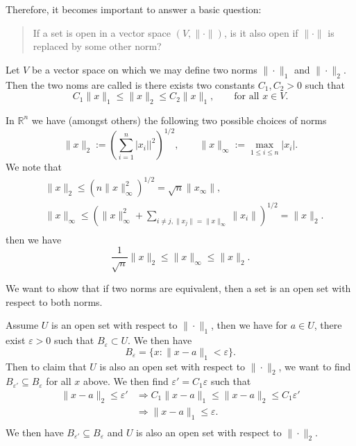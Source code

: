 \documentclass[10pt]{article}
\let\emph\relax %
\newcommand{\R}{\mathbb{R}}
\begin{document}
  Therefore, it becomes important to answer a basic question:
  \begin{quote}
    If a set is open in a vector space $(V,\|\cdot\|)$, is it also open if $\|\cdot\|$ is replaced by some other norm?
  \end{quote}

  \begin{definition}
    Let $V$ be a vector space on which we may define two norms $\|\cdot\|_{1}$ and $\|\cdot\|_{2}$. Then the two noms are called \emph{equivalent} is there exists two constants $C_{1},C_{2} > 0$ such that 
    \begin{equation}
      C_{1}\|x\|_{1} \leq \|x\|_{2} \leq C_{2}\|x\|_{1}, \qquad \text{for all }x \in V.
    \end{equation}
  \end{definition}

  \begin{example}
    In $\R^{n}$ we have (amongst others) the following two possible choices of norms 
    \begin{equation}
      \|x\|_{2}:=\left(\sum_{i = 1}^{n}|x_{i}||^{2}\right)^{1/2}, \qquad \|x\|_\infty:= \max_{1 \leq i \leq n}|x_{i}|.
    \end{equation}
    We note that 
    \[
      \begin{aligned}
        &\|x\|_{2} \leq \left(n\|x\|_{\infty}^{2}\right)^{1/2} = \sqrt{n}\|x_{\infty}\|,\\
        &\|x\|_{\infty} \leq \left(\|x\|_{\infty}^{2}+\sum_{i \neq j, \|x_{j}\| = \|x\|_{\infty}}\|x_{i}\|\right)^{1/2} = \|x\|_{2}.\\
      \end{aligned}
    \]
    then we have
    \[\frac{1}{\sqrt{n}}\|x\|_{2} \leq \|x\|_{\infty} \leq \|x\|_{2}.\]
  \end{example}

  \begin{remark}
    We want to show that if two norms are equivalent, then a set is an open set with respect to both norms.

    Assume $U$ is an open set with respect to $\|\cdot\|_{1}$, then we have for $a \in U$, there exist $\varepsilon > 0$ such that $B_{\varepsilon} \subset U$. We then have
    \[B_{\varepsilon} = \{x:\|x-a\|_{1}<\varepsilon\}.\]
    Then to claim that $U$ is also an open set with respect to $\|\cdot\|_{2}$, we want to find $B_{\varepsilon'} \subseteq B_{\varepsilon}$ for all $x$ above. We then find $\varepsilon' = C_{1}\varepsilon$ such that 
    \[
      \begin{aligned}
        \|x-a\|_{2} \leq \varepsilon' &\Rightarrow C_{1}\|x-a\|_{1} \leq \|x-a\|_{2} \leq C_{1}\varepsilon'\\
        &\Rightarrow \|x-a\|_{1} \leq \varepsilon.\\
      \end{aligned}
    \]
    We then have $B_{\varepsilon'} \subseteq B_{\varepsilon}$ and $U$ is also an open set with respect to $\|\cdot\|_{2}$.
  \end{remark} 
\end{document}
